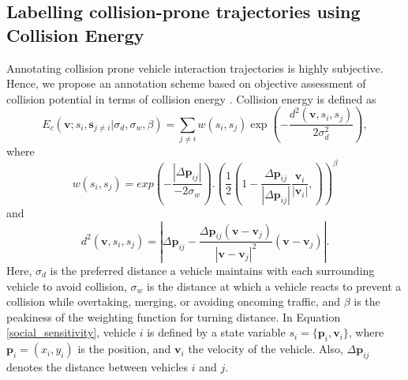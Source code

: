 \documentclass[final,journal]{IEEEtran}
\begin{document}
\subsection{Labelling collision-prone trajectories using Collision Energy}
Annotating collision prone vehicle interaction trajectories is highly subjective. Hence, we propose an annotation scheme based on objective assessment of collision potential in terms of collision energy \cite{social_etiquette}. Collision energy is defined as
\begin{equation}\label{social_sensitivity}
E_{c}(\mathbf{v}; s_i, \mathbf{s}_{j \neq i}| \sigma_d, \sigma_w, \beta) = \sum_{j \neq i} w(s_i, s_j) \exp \left ( −\frac{d^2(\mathbf{v},s_i,s_j)}{2\sigma^2_d} \right ),
\end{equation}
where 
\begin{equation}
w(s_i,s_j) = exp \left ( -\frac {|\Delta \mathbf{p}_{ij}|}{−2 \sigma_w}\right ) . \left ( \frac{1}{2} \left ( 1 - \frac{\Delta \mathbf{p}_{ij}}{|\Delta \mathbf{p}_{ij}|} \frac{\mathbf{v}_i}{| \mathbf{v}_i |}, \right ) \right )^ \beta \end{equation}
and 
\begin{equation}
    d^2 (\mathbf{v}, s_i, s_j ) = \left | \Delta \mathbf{p}_{ij} - \frac{\Delta \mathbf{p}_{ij} (\mathbf{v} - \mathbf{v}_j)}{|\mathbf{v} - \mathbf{v}_j |^2}(\mathbf{v} - \mathbf{v}_j)\right |.
\end{equation}
Here, $\sigma_d$ is the preferred distance a vehicle maintains with each surrounding vehicle to avoid collision, $\sigma_w$ is the distance at which a vehicle reacts to prevent a collision while overtaking, merging, or avoiding oncoming traffic, and $\beta$ is the peakiness of the weighting function for turning distance. In Equation \ref{social_sensitivity}, vehicle $i$ is defined by a state variable $s_i = \{\mathbf{p}_i , \mathbf{v}_i \}$, where $\mathbf{p}_i =(x_i,y_i)$ is the position, and $\mathbf{v}_i$ the velocity of the vehicle. Also, $\Delta \mathbf{p}_{ij}$ denotes the distance between vehicles $i$ and $j$.
\end{document}
